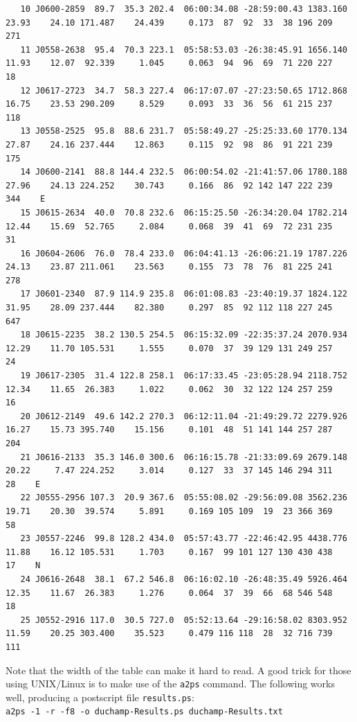 \documentclass[12pt,a4paper]{article}
\begin{document}
\begin{landscape}
{\begin{verbatim}
   10 J0600-2859  89.7  35.3 202.4  06:00:34.08 -28:59:00.43 1383.160    23.93    24.10 171.487    24.439     0.173  87  92  33  38 196 209   271     
   11 J0558-2638  95.4  70.3 223.1  05:58:53.03 -26:38:45.91 1656.140    11.93    12.07  92.339     1.045     0.063  94  96  69  71 220 227    18     
   12 J0617-2723  34.7  58.3 227.4  06:17:07.07 -27:23:50.65 1712.868    16.75    23.53 290.209     8.529     0.093  33  36  56  61 215 237   118     
   13 J0558-2525  95.8  88.6 231.7  05:58:49.27 -25:25:33.60 1770.134    27.87    24.16 237.444    12.863     0.115  92  98  86  91 221 239   175     
   14 J0600-2141  88.8 144.4 232.5  06:00:54.02 -21:41:57.06 1780.188    27.96    24.13 224.252    30.743     0.166  86  92 142 147 222 239   344    E
   15 J0615-2634  40.0  70.8 232.6  06:15:25.50 -26:34:20.04 1782.214    12.44    15.69  52.765     2.084     0.068  39  41  69  72 231 235    31     
   16 J0604-2606  76.0  78.4 233.0  06:04:41.13 -26:06:21.19 1787.226    24.13    23.87 211.061    23.563     0.155  73  78  76  81 225 241   278     
   17 J0601-2340  87.9 114.9 235.8  06:01:08.83 -23:40:19.37 1824.122    31.95    28.09 237.444    82.380     0.297  85  92 112 118 227 245   647     
   18 J0615-2235  38.2 130.5 254.5  06:15:32.09 -22:35:37.24 2070.934    12.29    11.70 105.531     1.555     0.070  37  39 129 131 249 257    24     
   19 J0617-2305  31.4 122.8 258.1  06:17:33.45 -23:05:28.94 2118.752    12.34    11.65  26.383     1.022     0.062  30  32 122 124 257 259    16     
   20 J0612-2149  49.6 142.2 270.3  06:12:11.04 -21:49:29.72 2279.926    16.27    15.73 395.740    15.156     0.101  48  51 141 144 257 287   204     
   21 J0616-2133  35.3 146.0 300.6  06:16:15.78 -21:33:09.69 2679.148    20.22     7.47 224.252     3.014     0.127  33  37 145 146 294 311    28    E
   22 J0555-2956 107.3  20.9 367.6  05:55:08.02 -29:56:09.08 3562.236    19.71    20.30  39.574     5.891     0.169 105 109  19  23 366 369    58     
   23 J0557-2246  99.8 128.2 434.0  05:57:43.77 -22:46:42.95 4438.776    11.88    16.12 105.531     1.703     0.167  99 101 127 130 430 438    17    N
   24 J0616-2648  38.1  67.2 546.8  06:16:02.10 -26:48:35.49 5926.464    12.35    11.67  26.383     1.276     0.064  37  39  66  68 546 548    18     
   25 J0552-2916 117.0  30.5 727.0  05:52:13.64 -29:16:58.02 8303.952    11.59    20.25 303.400    35.523     0.479 116 118  28  32 716 739   111     
  \end{verbatim}
}
Note that the
width of the table can make it hard to read. A good trick for those
using UNIX/Linux is to make use of the \texttt{a2ps} command. The
following works well, producing a postscript file \texttt{results.ps}:
\\\verb|a2ps -1 -r -f8 -o duchamp-Results.ps duchamp-Results.txt|


\end{landscape}
\end{document}
